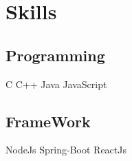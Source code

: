\documentclass[]{deedy-resume-openfont}
\begin{document}
\begin{minipage}[t]{0.30\textwidth}

\section{Skills}
\subsection{Programming}
C \textbullet{}   C++ \textbullet{} Java  \textbullet{} JavaScript \\

\subsection{FrameWork}
NodeJs \textbullet{}   Spring-Boot \textbullet{} ReactJs  











%
%

\end{minipage} 
\hfill
\end{document}
